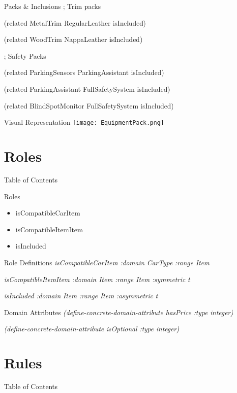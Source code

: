 \documentclass{beamer}
\begin{document}
\begin{frame}{Packs \& Inclusions}
; Trim packs

(related MetalTrim RegularLeather isIncluded)

(related WoodTrim NappaLeather isIncluded)

; Safety Packs

(related ParkingSensors ParkingAssistant isIncluded)

(related ParkingAssistant FullSafetySystem isIncluded)

(related BlindSpotMonitor FullSafetySystem isIncluded)
\end{frame}

\begin{frame}{Visual Representation}
    \texttt{[image: EquipmentPack.png]}
\end{frame}

\section{Roles}
\begin{frame}{Table of Contents}
    \tableofcontents[currentsection]
\end{frame}

\begin{frame}{Roles}
\begin{itemize}
    \item isCompatibleCarItem
    \item isCompatibleItemItem
    \item isIncluded
\end{itemize}
\end{frame}

\begin{frame}{Role Definitions}
\textit{isCompatibleCarItem :domain CarType :range Item}

\textit{isCompatibleItemItem :domain Item :range Item :symmetric t}

\textit{isIncluded :domain Item :range Item :asymmetric t}
\end{frame}

\begin{frame}{Domain Attributes}
\textit{(define-concrete-domain-attribute hasPrice :type integer)}

\textit{(define-concrete-domain-attribute isOptional :type integer)}
\end{frame}

\section{Rules}
\begin{frame}{Table of Contents}
    \tableofcontents[currentsection]
\end{frame}
\end{document}
